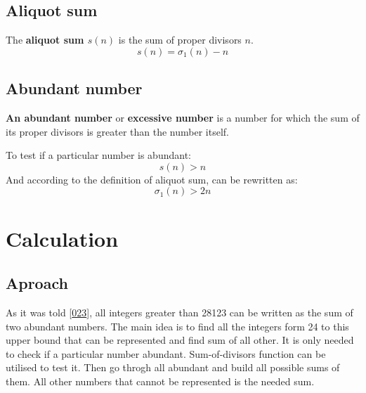 \documentclass{article}
\begin{document}
\subsection{Aliquot sum}
The \textbf{aliquot sum $s(n)$} is the sum of proper divisors $n$.
\begin{equation*}
    s(n) = \sigma_{1}(n) - n
\end{equation*}

\subsection{Abundant number}
\textbf{An abundant number} or \textbf{excessive number} is a number for which the sum of its 
proper divisors is greater than the number itself.

To test if a particular number is abundant:
\begin{equation*}
    s(n) > n
\end{equation*}
And according to the definition of aliquot sum, can be rewritten as:
\begin{equation*}
    \sigma_{1}(n) > 2n
\end{equation*}

\section{Calculation}
\subsection{Aproach}
As it was told [\href{https://projecteuler.net/problem=23}{023}], all integers greater than 
28123 can be written as the sum of two abundant numbers. The main idea is to find all the integers 
form 24 to this upper bound that can be represented and find sum of all other.
It is only needed to check if a particular number abundant. Sum-of-divisors function can 
be utilised to test it. Then go throgh all abundant and build all possible sums of them.
All other numbers that cannot be represented is the needed sum.
\end{document}
